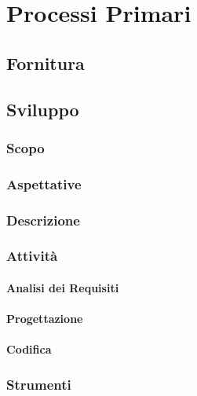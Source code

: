 \section{Processi Primari}
	\subsection{Fornitura}
	\subsection{Sviluppo}
		\subsubsection{Scopo}
		\subsubsection{Aspettative}
		\subsubsection{Descrizione}
		\subsubsection{Attività}
			\paragraph{Analisi dei Requisiti}
			\paragraph{Progettazione}
			\paragraph{Codifica}
		\subsubsection{Strumenti}